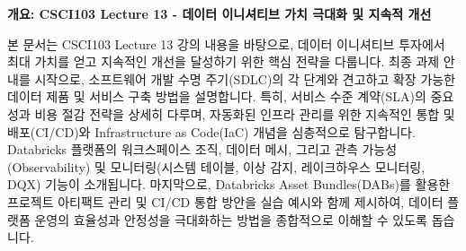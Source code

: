 \documentclass[11pt,a4paper]{article}
\begin{document}
\begin{summarybox}
\textbf{개요: CSCI103 Lecture 13 - 데이터 이니셔티브 가치 극대화 및 지속적 개선}

본 문서는 CSCI103 Lecture 13 강의 내용을 바탕으로, 데이터 이니셔티브 투자에서 최대 가치를 얻고 지속적인 개선을 달성하기 위한 핵심 전략을 다룹니다.
최종 과제 안내를 시작으로, 소프트웨어 개발 수명 주기(SDLC)의 각 단계와 견고하고 확장 가능한 데이터 제품 및 서비스 구축 방법을 설명합니다.
특히, 서비스 수준 계약(SLA)의 중요성과 비용 절감 전략을 상세히 다루며, 자동화된 인프라 관리를 위한 지속적인 통합 및 배포(CI/CD)와 Infrastructure as Code(IaC) 개념을 심층적으로 탐구합니다.
Databricks 플랫폼의 워크스페이스 조직, 데이터 메시, 그리고 관측 가능성(Observability) 및 모니터링(시스템 테이블, 이상 감지, 레이크하우스 모니터링, DQX) 기능이 소개됩니다.
마지막으로, Databricks Asset Bundles(DABs)를 활용한 프로젝트 아티팩트 관리 및 CI/CD 통합 방안을 실습 예시와 함께 제시하여, 데이터 플랫폼 운영의 효율성과 안정성을 극대화하는 방법을 종합적으로 이해할 수 있도록 돕습니다.
\end{summarybox}

\newpage
\end{document}
